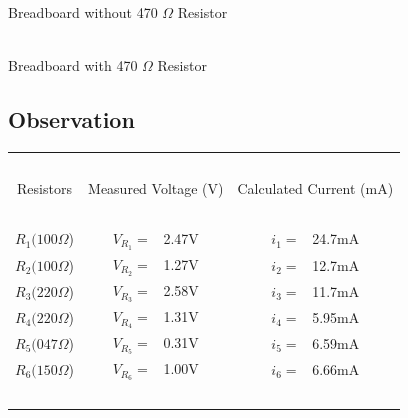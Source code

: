 \documentclass{article}
\begin{document}
\begin{multicols}{2}
\begin{center}
 \\ \vspace{5px}
Breadboard without 470 $\Omega$ Resistor \\

\columnbreak

 \\ \vspace{5px}
Breadboard with 470 $\Omega$ Resistor
\end{center}
\end{multicols}


\subsection{Observation}
\vspace{5px}
\begin{center}
\begin{tabular}{|c | c | c |} 
 \hline
    \ & \ & \ \\
    Resistors & Measured Voltage (V) & Calculated Current (mA) \\ [1em]
    \hline
    \ & \ & \ \\
    $R_1(100 \Omega$) & $V_{R_1}=$ \ 2.47V & $i_1=$ \ 24.7mA  \\
    $R_2(100 \Omega$) & $V_{R_2}=$ \ 1.27V & $i_2=$ \ 12.7mA  \\
    $R_3(220 \Omega$) & $V_{R_3}=$ \ 2.58V & $i_3=$ \ 11.7mA  \\
    $R_4(220 \Omega$) & $V_{R_4}=$ \ 1.31V & $i_4=$ \ 5.95mA  \\
    $R_5(047 \Omega$) & $V_{R_5}=$ \ 0.31V & $i_5=$ \ 6.59mA  \\
    $R_6(150 \Omega$) & $V_{R_6}=$ \ 1.00V & $i_6=$ \ 6.66mA  \\
    \ & \ & \ \\
 \hline
\end{tabular}
\end{center}
\end{document}
